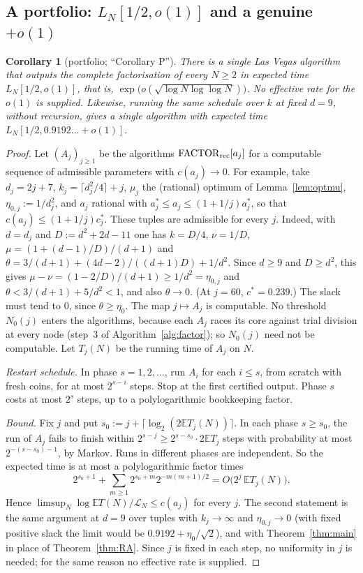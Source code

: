 \documentclass[11pt]{amsart}
\newtheorem{corollary}[theorem]{Corollary}
\theoremstyle{definition}
\newcommand{\cL}{\mathcal{L}}
\newcommand{\Ex}{\mathbb{E}}
\begin{document}
\subsection{A portfolio: \texorpdfstring{$L_N[1/2,o(1)]$}{L[1/2,o(1)]} and a genuine \texorpdfstring{$+o(1)$}{+o(1)}}

\begin{corollary}[portfolio; ``Corollary P'']\label{cor:P}
There is a single Las Vegas algorithm that outputs the complete factorisation of every $N\ge2$ in expected time $L_N[1/2,o(1)]$, that is,
$\exp\bigl(o(\sqrt{\log N\log\log N})\bigr)$. No effective rate for the $o(1)$ is supplied. Likewise, running the same schedule over $k$ at
fixed $d=9$, without recursion, gives a single algorithm with expected time $L_N[1/2,0.9192\ldots+o(1)]$.
\end{corollary}

\begin{proof}
Let $(A_j)_{j\ge1}$ be the algorithms $\mathrm{FACTOR}_{\rm rec}[a_j]$ for a computable sequence of admissible parameters with $c(a_j)\to0$. For example, take
$d_j=2j+7$, $k_j=\lceil d_j^2/4\rceil+j$, $\mu_j$ the (rational) optimum of Lemma~\ref{lem:optmu}, $\eta_{0,j}:=1/d_j^2$, and $a_j$ rational with
$a^*_j\le a_j\le(1+1/j)a^*_j$, so that $c(a_j)\le(1+1/j)c^*_j$. These tuples are admissible for every $j$. Indeed, with $d=d_j$ and $D:=d^2+2d-11$ one has
$k=D/4$, $\nu=1/D$, $\mu=(1+(d-1)/D)/(d+1)$ and $\theta=3/(d+1)+(4d-2)/((d+1)D)+1/d^2$. Since $d\ge9$ and $D\ge d^2$, this gives
$\mu-\nu=(1-2/D)/(d+1)\ge1/d^2=\eta_{0,j}$ and $\theta<3/(d+1)+5/d^2<1$, and also $\theta\to0$. (At $j=60$, $c^*=0.239$.) The slack must tend to $0$,
since $\theta\ge\eta_0$. The map $j\mapsto A_j$ is computable. No threshold $N_0(j)$ enters
the algorithms, because each $A_j$ races its core against trial division at every node (step~3 of Algorithm~\ref{alg:factor}); so
$N_0(j)$ need not be computable. Let $T_j(N)$ be the running time of $A_j$ on $N$.

\emph{Restart schedule.} In phase $s=1,2,\dots$, run $A_i$ for each $i\le s$, from scratch with fresh coins, for at most $2^{s-i}$ steps.
Stop at the first certified output. Phase $s$ costs at most $2^s$ steps, up to a polylogarithmic bookkeeping factor.

\emph{Bound.} Fix $j$ and put $s_0:=j+\lceil\log_2(2\Ex T_j(N))\rceil$. In each phase $s\ge s_0$, the run of $A_j$ fails to finish within
$2^{s-j}\ge2^{s-s_0}\cdot2\Ex T_j$ steps with probability at most $2^{-(s-s_0)-1}$, by Markov. Runs in different phases are independent. So the expected
time is at most a polylogarithmic factor times
\[
2^{s_0+1}+\sum_{m\ge1}2^{s_0+m}2^{-m(m+1)/2}=O\bigl(2^j\,\Ex T_j(N)\bigr).
\]
Hence $\limsup_N\log\Ex T(N)/\cL_N\le c(a_j)$ for every $j$. The second statement is the same argument at $d=9$ over tuples with $k_j\to\infty$
and $\eta_{0,j}\to0$ (with fixed positive slack the limit would be $0.9192+\eta_0/\sqrt2$), and with Theorem~\ref{thm:main} in place of
Theorem~\ref{thm:RA}. Since $j$ is fixed in each step, no uniformity in $j$ is needed; for the same reason no effective rate is supplied.
\end{proof}
\end{document}
